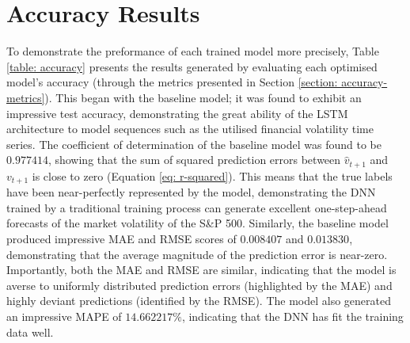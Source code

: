 \documentclass[a4paper, 11pt]{report}
\begin{document}
    \section{Accuracy Results}

    To demonstrate the preformance of each trained model more precisely, Table \ref{table: accuracy} presents the results generated by evaluating each optimised model's accuracy (through the metrics presented in Section \ref{section: accuracy-metrics}). This began with the baseline model; it was found to exhibit an impressive test accuracy, demonstrating the great ability of the LSTM architecture to model sequences such as the utilised financial volatility time series. The coefficient of determination of the baseline model was found to be $0.977414$, showing that the sum of squared prediction errors between $\hat{v}_{t+1}$ and $v_{t+1}$ is close to zero (Equation \ref{eq: r-squared}). This means that the true labels have been near-perfectly represented by the model, demonstrating the DNN trained by a traditional training process can generate excellent one-step-ahead forecasts of the market volatility of the S\&P 500. Similarly, the baseline model produced impressive MAE and RMSE scores of $0.008407$ and $0.013830$, demonstrating that the average magnitude of the prediction error is near-zero. Importantly, both the MAE and RMSE are similar, indicating that the model is averse to uniformly distributed prediction errors (highlighted by the MAE) and highly deviant predictions (identified by the RMSE). The model also generated an impressive MAPE of $14.662217\%$, indicating that the DNN has fit the training data well.
\end{document}
